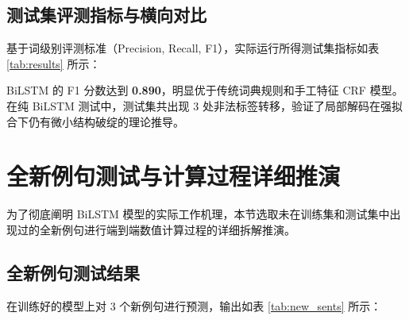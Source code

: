 \documentclass[11pt,a4paper]{ctexart}
\begin{document}
\subsection{测试集评测指标与横向对比}

基于词级别评测标准（Precision, Recall, F1），实际运行所得测试集指标如表 \ref{tab:results} 所示：

\begin{table}[H]
    \centering
    \small
    \caption{测试集真实分词效果与上机各算法综合对比}
    \label{tab:results}
\end{table}

BiLSTM 的 F1 分数达到 \textbf{0.890}，明显优于传统词典规则和手工特征 CRF 模型。在纯 BiLSTM 测试中，测试集共出现 3 处非法标签转移，验证了局部解码在强拟合下仍有微小结构破绽的理论推导。

\section{全新例句测试与计算过程详细推演}

为了彻底阐明 BiLSTM 模型的实际工作机理，本节选取未在训练集和测试集中出现过的全新例句进行端到端数值计算过程的详细拆解推演。

\subsection{全新例句测试结果}

在训练好的模型上对 3 个新例句进行预测，输出如表 \ref{tab:new_sents} 所示：
\end{document}
